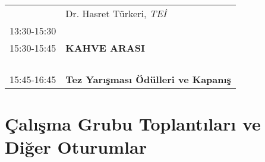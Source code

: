 \begin{table}[hbt!]
{\begin{tabular}{@{}ll@{}}
                              & Dr. Hasret Türkeri, \textit{TEİ}                                                   \\
\multirow{-9}{*}{13:30-15:30} &                                                                                    \\
\rowcolor[HTML]{C0C0C0} 
15:30-15:45                   & \textbf{KAHVE ARASI}                                                               \\
                              &                                                                                    \\
                              &                                                                                    \\
                              &                                                                                    \\
                              &                                                                                    \\
\multirow{-5}{*}{15:45-16:45} &
  \multirow{-5}{*}{\textbf{Tez Yarışması Ödülleri ve Kapanış}} \\ \bottomrule
\end{tabular}%
}
\end{table}


\newpage
\section{Çalışma Grubu Toplantıları ve Diğer Oturumlar}

